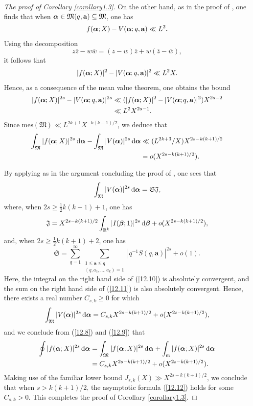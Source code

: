 \documentclass[12pt,reqno]{amsart}
\theoremstyle{definition}
\theoremstyle{remark}
\numberwithin{equation}{section}
\def\bfa{{\mathbf a}}
\def\dbR{{\mathbb R}}\def\dbT{{\mathbb T}}
\def\grJ{{\mathfrak J}}
\def\grm{{\mathfrak m}}\def\grM{{\mathfrak M}}
\def\grS{{\mathfrak S}}\def\grP{{\mathfrak P}}
\def\le{\leqslant} \def\ge{\geqslant} \def\pleq{\preccurlyeq} \def\ple{\prec}
\def\d{{\,{\rm d}}}
\begin{document}
\begin{proof}[The proof of Corollary \ref{corollary1.3}]
On the other hand, as in the proof of \cite[Lemma 7.1]{Woo2017a}, one finds that 
when $\bfalp\in \grM(q,\bfa)\subseteq \grM$, one has
$$f(\bfalp;X)-V(\bfalp;q,\bfa)\ll L^2.$$
Using the decomposition
$$z{\overline z}-w{\overline w}=(z-w){\overline z}+w({\overline z}-{\overline w}),$$
it follows that
$$|f(\bfalp;X)|^2-|V(\bfalp;q,\bfa)|^2\ll L^2X.$$
Hence, as a consequence of the mean value theorem, one obtains the bound
\begin{align*}
|f(\bfalp;X)|^{2s}-|V(\bfalp;q,\bfa)|^{2s}&\ll 
(|f(\bfalp;X)|^2-|V(\bfalp;q,\bfa)|^2)X^{2s-2}\\
&\ll L^2X^{2s-1}.
\end{align*}
Since $\text{mes}(\grM)\ll L^{2k+1}X^{-k(k+1)/2}$, we deduce that
\begin{align}
\int_\grM |f(\bfalp;X)|^{2s}\d\bfalp -\int_\grM |V(\bfalp)|^{2s}\d\bfalp &\ll (L^{2k+3}/X)
X^{2s-k(k+1)/2}\notag \\
&=o(X^{2s-k(k+1)/2}).\label{12.9}
\end{align}

\par By applying \cite[Theorems 1.3 and 2.4]{ACK2004} as in the argument concluding the 
proof of \cite[Lemma 7.1]{Woo2017a}, one sees that
$$\int_\grM |V(\bfalp)|^{2s}\d\bfalp =\grS \grJ,$$
where, when $2s\ge \frac{1}{2}k(k+1)+1$, one has
\begin{equation}\label{12.10}
\grJ=X^{2s-k(k+1)/2}\int_{\dbR^k}|I(\bfbet;1)|^{2s}\d\bfbet +o(X^{2s-k(k+1)/2}),
\end{equation}
and, when $2s\ge \frac{1}{2}k(k+1)+2$, one has
\begin{equation}\label{12.11}
\grS=\sum_{q=1}^\infty \sum_{\substack{1\le \bfa\le q\\ (q,a_1,\ldots ,a_k)=1}}
\left| q^{-1}S(q,\bfa)\right|^{2s}+o(1).
\end{equation}
Here, the integral on the right hand side of (\ref{12.10}) is absolutely convergent, and the 
sum on the right hand side of (\ref{12.11}) is also absolutely convergent. Hence, there 
exists a real number $C_{s,k}\ge 0$ for which
$$\int_\grM |V(\bfalp)|^{2s}\d\bfalp =C_{s,k}X^{2s-k(k+1)/2}+o(X^{2s-k(k+1)/2}),$$
and we conclude from (\ref{12.8}) and (\ref{12.9}) that
\begin{align}
\oint |f(\bfalp;X)|^{2s}\d\bfalp &=\int_\grM |f(\bfalp;X)|^{2s}\d\bfalp +
\int_\grm |f(\bfalp;X)|^{2s}\d\bfalp \notag \\
&=C_{s,k}X^{2s-k(k+1)/2}+o(X^{2s-k(k+1)/2}).\label{12.12}
\end{align}
Making use of the familiar lower bound $J_{s,k}(X)\gg X^{2s-k(k+1)/2}$, we conclude that 
when $s>k(k+1)/2$, the asymptotic formula (\ref{12.12}) holds for some $C_{s,k}>0$. 
This completes the proof of Corollary \ref{corollary1.3}.
\end{proof}
\end{document}
